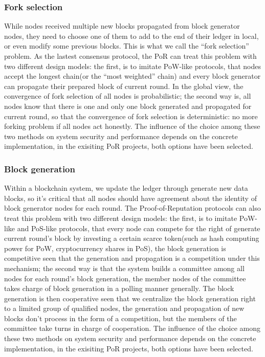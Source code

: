 \documentclass[doublespacing]{bmcart}
\begin{document}
\begin{CJK*}{UTF8}{gbsn}
\subsubsection*{Fork selection}
While nodes received multiple new blocks propagated from block generator nodes, they need to choose one of them to add to the end of their ledger in local, or even modify some previous blocks. This is what we call the ``fork selection'' problem. 
 As the lastest consensus protocol, the PoR can treat this problem with two different design models: the first, is to imitate PoW-like protocols, that nodes accept the longest chain(or the ``most weighted'' chain) and every block generator can propagate their prepared block of current round. In the global view, the convergence of fork selection of all nodes is probabilistic; the second way is, all nodes know that there is one and only one block generated and propagated for current round, so that the convergence of fork selection is deterministic: no more forking problem if all nodes act honestly.
 The influence of the choice among these two methods on system security and performance depends on the concrete implementation, in the exisiting PoR projects, both options have been selected.
\subsubsection*{Block generation}
Within a blockchain system, we update the ledger through generate new data blocks, so it's critical that all nodes should have agreement about the identity of  block generator nodes for each round.
 The Proof-of-Reputation protocols can also treat this problem with two different design models: the first, is to imitate PoW-like and PoS-like protocols, that every node can compete for the right of generate current round's block by investing a certain scarce token(such as hash computing power for PoW, cryptocurrency shares in PoS), the block generation is competitive seen that the generation and propagation is a competition under this mechanism; the second way is that the system builds a committee among all nodes for each round's block generation, the member nodes of the committee takes charge of block generation in a polling manner generally. The block generation is then cooperative seen that we centralize the block generation right to a limited group of qualified nodes, the generation and propagation of new blocks don't process in the form of a competition, but the members of the committee take turns in charge of cooperation. The influence of the choice among these two methods on system security and performance depends on the concrete implementation, in the exisiting PoR projects, both options have been selected.

\end{CJK*}
\end{document}
